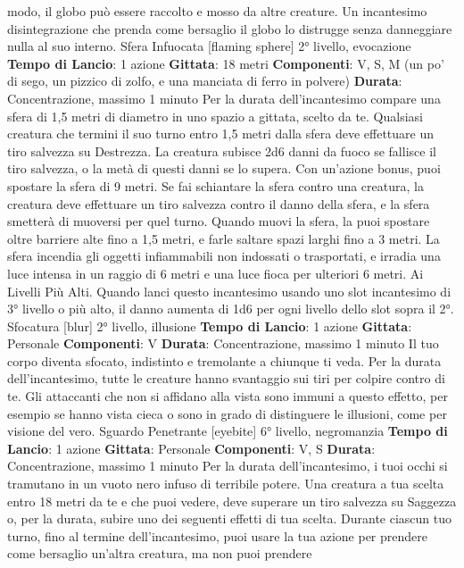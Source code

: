 \begin{multicols}{2}
modo, il globo può essere raccolto e mosso da altre
creature.
Un incantesimo disintegrazione che prenda come
bersaglio il globo lo distrugge senza danneggiare nulla
al suo interno.
Sfera Infuocata
[flaming sphere]
2° livello, evocazione
\textbf{Tempo di Lancio}: 1 azione
\textbf{Gittata}: 18 metri
\textbf{Componenti}: V, S, M (un po’ di sego, un pizzico di
zolfo, e una manciata di ferro in polvere)
\textbf{Durata}: Concentrazione, massimo 1 minuto
Per la durata dell’incantesimo compare una sfera di 1,5
metri di diametro in uno spazio a gittata, scelto da te.
Qualsiasi creatura che termini il suo turno entro 1,5
metri dalla sfera deve effettuare un tiro salvezza su
Destrezza. La creatura subisce 2d6 danni da fuoco se
fallisce il tiro salvezza, o la metà di questi danni se lo
supera.
Con un’azione bonus, puoi spostare la sfera di 9 metri.
Se fai schiantare la sfera contro una creatura, la
creatura deve effettuare un tiro salvezza contro il danno
della sfera, e la sfera smetterà di muoversi per quel
turno.
Quando muovi la sfera, la puoi spostare oltre barriere
alte fino a 1,5 metri, e farle saltare spazi larghi fino a 3
metri. La sfera incendia gli oggetti infiammabili non
indossati o trasportati, e irradia una luce intensa in un
raggio di 6 metri e una luce fioca per ulteriori 6 metri.
Ai Livelli Più Alti. Quando lanci questo incantesimo
usando uno slot incantesimo di 3° livello o più alto, il
danno aumenta di 1d6 per ogni livello dello slot sopra il
2°.
Sfocatura
[blur]
2° livello, illusione
\textbf{Tempo di Lancio}: 1 azione
\textbf{Gittata}: Personale
\textbf{Componenti}: V
\textbf{Durata}: Concentrazione, massimo 1 minuto
Il tuo corpo diventa sfocato, indistinto e tremolante a
chiunque ti veda. Per la durata dell’incantesimo, tutte le
creature hanno svantaggio sui tiri per colpire contro di
te. Gli attaccanti che non si affidano alla vista sono
immuni a questo effetto, per esempio se hanno vista
cieca o sono in grado di distinguere le illusioni, come
per visione del vero.
Sguardo Penetrante
[eyebite]
6° livello, negromanzia
\textbf{Tempo di Lancio}: 1 azione
\textbf{Gittata}: Personale
\textbf{Componenti}: V, S
\textbf{Durata}: Concentrazione, massimo 1 minuto
Per la durata dell’incantesimo, i tuoi occhi si tramutano
in un vuoto nero infuso di terribile potere. Una creatura
a tua scelta entro 18 metri da te e che puoi vedere,
deve superare un tiro salvezza su Saggezza o, per la
durata, subire uno dei seguenti effetti di tua scelta.
Durante ciascun tuo turno, fino al termine
dell’incantesimo, puoi usare la tua azione per prendere
come bersaglio un’altra creatura, ma non puoi prendere

\end{multicols}
